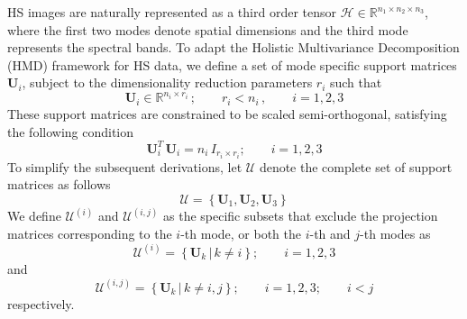 \documentclass[12pt,onecolumn]{article}
\begin{document}
HS images are naturally represented as a third order tensor $\mathcal{H} \in \mathbb{R}^{n_1 \times n_2 \times n_3}$, where the first two modes denote spatial dimensions and the third mode represents the spectral bands. To adapt the Holistic Multivariance Decomposition (HMD) framework for HS data, we define a set of mode specific support matrices $\mathbf{U}_i$, subject to the dimensionality reduction parameters $r_i$ such that
\begin{equation}
\mathbf{U}_i \in \mathbb{R}^{n_i \times r_i}\,; \qquad r_i < n_i\,, \qquad i=1, 2, 3
\label{eq:Si}
\end{equation}
These support matrices are constrained to be scaled semi-orthogonal, satisfying the following condition
\begin{equation}
\label{eq:Sorth}
\mathbf{U}_i^T\, \mathbf{U}_i = n_i\,I_{r_i \times r_i}; \qquad i=1, 2, 3
\end{equation}
To simplify the subsequent derivations, let $\mathcal{U}$ denote the complete set of support matrices as follows
\begin{equation}
\mathcal{U} = \left\{\mathbf{U}_1, \mathbf{U}_2, \mathbf{U}_3\right\}
\end{equation}
We define $\mathcal{U}^{(i)}$ and $\mathcal{U}^{(i,j)}$ as the specific subsets that exclude the projection matrices corresponding to the $i$-th mode, or both the $i$-th and $j$-th modes as 
\begin{equation}
\label{eq:Sis}
\mathcal{U}^{(i)} = \left\{\mathbf{U}_k\, \vert \, k \neq i \right\}; \qquad i=1, 2, 3
\end{equation}
and 
\begin{equation}
\label{eq:Sijs}
\mathcal{U}^{(i,j)} = \left\{\mathbf{U}_k \, \vert \, k \neq i, j \right\} ; \qquad i=1, 2, 3; \qquad i < j
\end{equation}
respectively. 
\end{document}
